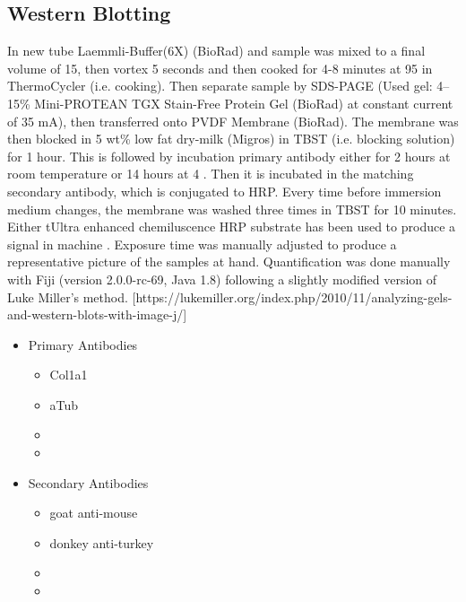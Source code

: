 \subsection{Western Blotting}
In new tube Laemmli-Buffer(6X) (BioRad) and sample was mixed to a final volume of 15\mul{}, then  vortex 5 seconds and then cooked for 4-8 minutes at 95 \degC in ThermoCycler (i.e. cooking). Then separate sample by SDS-PAGE (Used gel: 4–15\% Mini-PROTEAN TGX Stain-Free Protein Gel (BioRad) at constant current of 35 mA), then transferred onto PVDF Membrane (BioRad). The membrane was then blocked in 5 wt\% low fat dry-milk (Migros) in TBST (i.e. blocking solution) for 1 hour. This is followed by incubation primary antibody either for 2 hours at room temperature or 14 hours at 4 \degC{}. Then it is incubated in the matching secondary antibody, which is conjugated to HRP. Every time before immersion medium changes, the membrane was washed three times in TBST for 10 minutes. Either tUltra enhanced chemiluscence HRP substrate  has been used to produce a signal in machine . Exposure time was manually adjusted to produce a representative picture of the samples at hand. Quantification was done manually with Fiji (version 2.0.0-rc-69, Java 1.8) following a slightly modified version of Luke Miller's method. [https://lukemiller.org/index.php/2010/11/analyzing-gels-and-western-blots-with-image-j/]




\begin{itemize}
    \item Primary Antibodies
    \begin{itemize}
        \item Col1a1
        \item aTub
        \item 
        \item 
    \end{itemize}
        \item Secondary Antibodies
    \begin{itemize}
        \item goat anti-mouse
        \item donkey anti-turkey
        \item 
        \item 
    \end{itemize}
\end{itemize}


